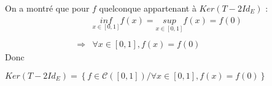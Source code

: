 On a montré que pour $f$ quelconque appartenant à $Ker(T-2Id_E)$ :
\[
  \begin{array}{rl}
                & \underset{x\in[0,1]}{inf}f(x) = \underset{x\in[0,1]}{sup}f(x) = f(0) \\\\
    \Rightarrow & \forall x\in[0,1], f(x) = f(0)
  \end{array}
\]
Donc
\begin{result}
  $Ker(T-2Id_E) = \left\{f\in\mathcal{C}([0, 1]) / \forall x\in[0,1], f(x) = f(0)\right\}$
\end{result}

